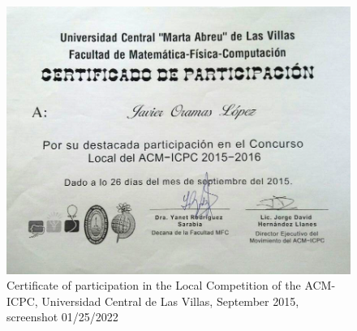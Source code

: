 \documentclass[a4paper,12pt]{article}
\begin{document}
\begin{figure}[h]
    \centering
    \includegraphics[width=\textwidth]{images/2016local.png}
    \caption{Certificate of participation in the Local Competition of the ACM-ICPC, Universidad Central de Las Villas, September 2015, screenshot 01/25/2022}
    \label{sec:local2016}
\end{figure}
\end{document}
